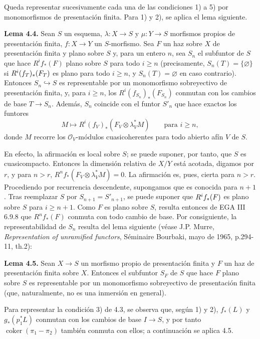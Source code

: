 Queda representar sucesivamente cada una de las condiciones 1) a 5) por
monomorfismos de presentación finita. Para 1) y 2), se aplica el lema
siguiente.

\textbf{Lema 4.4.} Sean $S$ un esquema,
$\lambda:X\to S$ y $\mu:Y\to S$ morfismos propios de presentación finita,
$f:X\to Y$ un $S$-morfismo. Sea $F$ un haz sobre $X$ de presentación finita
y plano sobre $S$ y, para un entero $n$, sea $S_n$ el subfuntor de $S$ que
hace $R^if_*(F)$ plano sobre $S$ para todo $i\geq n$ (precisamente,
$S_n(T)=\{\varnothing\}$ si
$R^{\sisi{1}{i}}(f_T)_*(F_T)$ es plano para todo $i\geq n$, y
$S_n(T)=\varnothing$ en caso contrario). Entonces
$S_n\hookrightarrow S$ es representable por un monomorfismo sobreyectivo de
presentación finita, y, para $i\geq n$, los
$R^i(f_{S_n})_*(F_{S_n})$ conmutan con los cambios de base $T\to S_n$.
Además, $S_n$ coincide con el funtor $S'_n$ que hace exactos los funtores
\[
M\longmapsto R^i(f_V)_*(F_V\otimes\lambda_V^*M)
\qquad\text{para }i\geq n,
\]
donde $M$ recorre los $\mathcal O_V$-módulos cuasicoherentes para todo
abierto afín $V$ de $S$.

En efecto, la afirmación es local sobre $S$; se puede suponer, por tanto,
que $S$ es cuasicompacto. Entonces la dimensión relativa de $X/Y$ está
acotada, digamos por $r$, y para $n>r$,
$R^nf_*(F_V\otimes\lambda_V^*M)=0$. La afirmación es, pues, cierta para
$n>r$. Procediendo por recurrencia descendente, supongamos que es conocida
para $n+1$. Tras reemplazar $S$ por $S_{n+1}=S'_{n+1}$, se puede suponer que
$R^{\sisi{n}{i}}f_*(F)$ es plano sobre $S$ para $i\geq n+1$. Como $F$ es
plano sobre $S$, resulta entonces de EGA III 6.9.8 que $R^nf_*(F)$ conmuta
con todo cambio de base. Por consiguiente, la representabilidad de $S_n$
resulta del lema siguiente (véase J.P. Murre, \emph{Representation of
unramified functors}, Séminaire Bourbaki, mayo de 1965, p.294-11, th.2):

\textbf{Lema 4.5.} Sean $X\to S$ un morfismo propio de presentación finita
y $F$ un haz de presentación finita sobre $X$. Entonces el subfuntor $S_F$
de $S$ que hace $F$ plano sobre $S$ es representable por un monomorfismo
sobreyectivo de presentación finita (que, naturalmente, no es una inmersión
en general).

Para representar la condición 3) de 4.3, se observa que, según 1) y 2),
$f_*(L)$ y $g_*(p_1^*L)$ conmutan con los cambios de base $I\to S$, y por
tanto $\operatorname{coker}(\pi_1-\pi_2)$ también conmuta con ellos; a
continuación se aplica 4.5.

